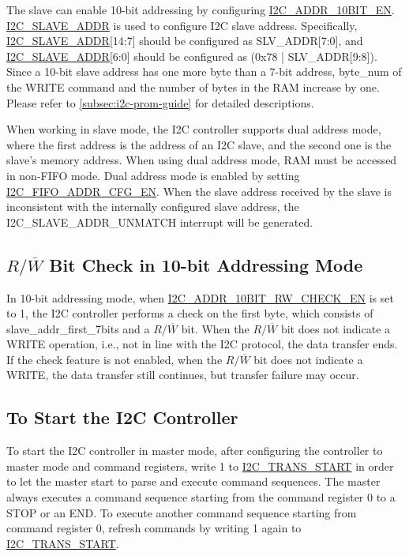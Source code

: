 \documentclass[main\_\_EN.tex]{subfiles}
\begin{document}
The slave can enable 10-bit addressing by configuring \hyperref[fielddesc:I2CADDR10BITEN]{I2C\_ADDR\_10BIT\_EN}. \hyperref[fielddesc:I2CSLAVEADDR]{I2C\_SLAVE\_ADDR} is used to configure I2C slave address. Specifically, \hyperref[fielddesc:I2CSLAVEADDR]{I2C\_SLAVE\_ADDR}[14:7] should be configured as SLV\_ADDR[7:0], and  \hyperref[fielddesc:I2CSLAVEADDR]{I2C\_SLAVE\_ADDR}[6:0] should be configured as (0x78 | SLV\_ADDR[9:8]). Since a 10-bit slave address has one more byte than a 7-bit address, byte\_num of the WRITE command and the number of bytes in the RAM increase by one. Please refer to \ref{subsec:i2c-prom-guide} for detailed descriptions.

When working in slave mode, the I2C controller supports dual address mode, where the first address is the address of an I2C slave, and the second one is the slave's memory address. When using dual address mode, RAM must be accessed in non-FIFO mode.
Dual address mode is enabled by setting \hyperref[fielddesc:I2CFIFOADDRCFGEN]{I2C\_FIFO\_ADDR\_CFG\_EN}. When the slave address received by the slave is inconsistent with the internally configured slave address, the I2C\_SLAVE\_ADDR\_UNMATCH interrupt will be generated.

\subsection{\texorpdfstring{$R/\overline W$ Bit Check in 10-bit Addressing Mode}{R/W Bit Check in 10-bit Addressing Mode}}
In 10-bit addressing mode, when \hyperref[fielddesc:I2CADDR10BITRWCHECKEN]{I2C\_ADDR\_10BIT\_RW\_CHECK\_EN} is set to 1, the I2C controller performs a check on the first byte, which consists of slave\_addr\_first\_7bits and a $R/\overline W$ bit. When the $R/\overline W$ bit does not indicate a WRITE operation, i.e., not in line with the I2C protocol, the data transfer ends. If the check feature is not enabled, when the $R/\overline W$ bit does not indicate a WRITE, the data transfer still continues, but transfer failure may occur.

\subsection{To Start the I2C Controller}
\label{subsubsec:i2c-start}
To start the I2C controller in master mode, after configuring the controller to master mode and command registers, write 1 to \hyperref[fielddesc:I2CTRANSSTART]{I2C\_TRANS\_START} in order to let the master start to parse and execute command sequences. The master always executes a command sequence starting from the command register 0 to a STOP or an END. To execute another command sequence starting from command register 0, refresh commands by writing 1 again to \hyperref[fielddesc:I2CTRANSSTART]{I2C\_TRANS\_START}.
\end{document}
